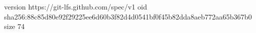 version https://git-lfs.github.com/spec/v1
oid sha256:88c85d80e92f29225ee6d60b3f82d4d0541bf0f45b82dda8aeb772aa65b367b0
size 74
